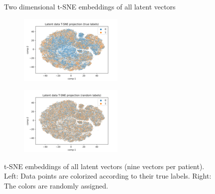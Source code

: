 \begin{figure}[H]
	\caption{Two dimensional t-SNE embeddings of all latent vectors}
	\begin{subfigure}[t]{0.48\textwidth}\centering
		\includegraphics[width=1\linewidth]{bilder/tsne-latent-41.png}%
		\label{fig:tsne-latents-normal}	
	\end{subfigure}%
	\hfill	
	\begin{subfigure}[t]{0.48\textwidth}\centering
		\includegraphics[width=1\linewidth]{bilder/tsne-latent-(random).png}%
		\label{fig:tsne-latents-random}
	\end{subfigure}
	\caption*{t-SNE embeddings of all latent vectors (nine vectors per patient). Left: Data points are colorized according to their true labels. Right: The colors are randomly assigned.}
	\label{plot:tsne-latent}
\end{figure}

